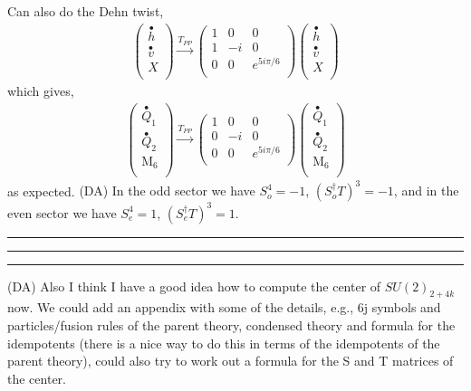 \documentclass[12pt,a4paper]{article}
\newcounter{arrow}
\newcommand{\dave}[1]{{\color{ao(english)}\footnotesize{(DA) #1}}}
\newcommand{\kwsep}{\bigskip\hrule\medskip\hrule\medskip\hrule\bigskip}
\begin{document}
Can also do the Dehn twist,
\begin{align}
\left( \begin{matrix}
\stackrel{\bullet}{h} \\
\stackrel{\bullet}{v} \\
X \\
\end{matrix} \right)
\xrightarrow{T_{PP}} 
\left( \begin{matrix}
1&0  &0 \\ 
1&-i &0 \\
0&0& e^{5 i \pi /6} \\
\end{matrix} \right)
\left( \begin{matrix}
\stackrel{\bullet}{h} \\
\stackrel{\bullet}{v} \\
X \\\end{matrix} \right)
\end{align}
which gives,
\begin{align}
\left( \begin{matrix}
\stackrel{\bullet}{Q}_{1}\\
\stackrel{\bullet}{Q}_{2}\\
\text{M}_6 \\ 
\end{matrix} \right) \xrightarrow{T_{PP}}
\left( \begin{matrix} 
1 & 0&0 \\
0 & -i & 0 \\
0 & 0& e^{5 i \pi /6}\\
\end{matrix} \right) 
\left( \begin{matrix}
\stackrel{\bullet}{Q}_{1}\\
\stackrel{\bullet}{Q}_{2}\\
\text{M}_6 \\ 
\end{matrix} \right)
\end{align}
as expected.
\dave{In the odd sector we have $S_o^4 = -1$, $(S_o^{\dagger} T)^3 = -1$, and in the even sector we have $S_e^4 = 1$, $(S_e^{\dagger} T)^3 = 1$.}



\kwsep


\dave{Also I think I have a good idea how to compute the center of $SU(2)_{2+4k}$ now. 
We could add an appendix with some of the details, e.g., 6j symbols and particles/fusion rules of the parent theory, condensed theory and formula for the idempotents (there is a nice way to do this in terms of the idempotents of the parent theory), could also try to work out a formula for the S and T matrices of the center.}
\end{document}
